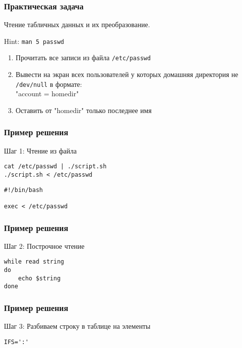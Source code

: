 
\begin{frame}[fragile]
	\frametitle{Практическая задача}

	Чтение табличных данных и их преобразование.

	\pause

	Hint: {\tt man 5 passwd}

	\begin{enumerate}
		\item Прочитать все записи из файла {\tt /etc/passwd}
		\item Вывести на экран всех пользователей у которых 
			домашняя директория не {\tt /dev/null} в формате:\\
			"account = homedir"
		\item Оставить от "homedir" только последнее имя
	\end{enumerate}
\end{frame}


\begin{frame}[fragile]
	\frametitle{Пример решения}

	\begin{block}{Шаг 1: Чтение из файла}

	\begin{lstlisting}
cat /etc/passwd | ./script.sh
./script.sh < /etc/passwd
\end{lstlisting}

	\begin{lstlisting}
#!/bin/bash

exec < /etc/passwd
\end{lstlisting}

	\end{block}
\end{frame}


\begin{frame}[fragile]
	\frametitle{Пример решения}

	\begin{block}{Шаг 2: Построчное чтение}

	\begin{lstlisting}
while read string
do
    echo $string
done
\end{lstlisting}

	\end{block}
\end{frame}

\begin{frame}[fragile]
	\frametitle{Пример решения}

	\begin{block}{Шаг 3: Разбиваем строку в таблице на элементы}

	\begin{lstlisting}
IFS=':'
\end{lstlisting}

	\end{block}
\end{frame}

